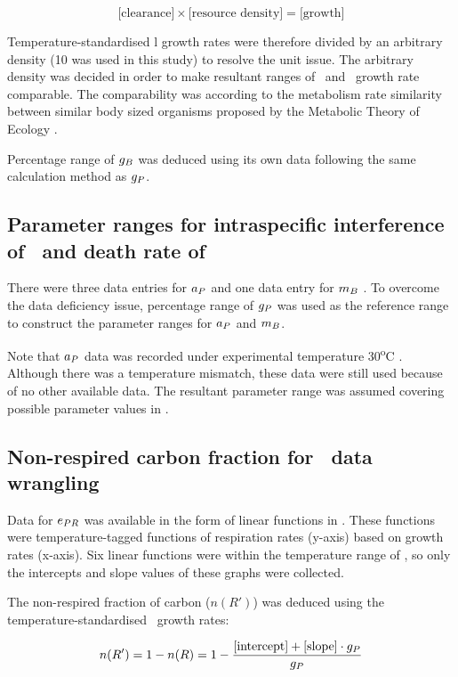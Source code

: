 \documentclass[../thesis.tex]{subfiles} %
\begin{document}
\begin{equation}
    \text{[clearance]} \times \text{[resource density]} = \text{[growth]}
    \label{eq:gB}
\end{equation}

Temperature-standardised \bac l growth rates were therefore divided by an arbitrary density (10 was used in this study) to resolve the unit issue.  The arbitrary density was decided in order to make resultant ranges of \phy\ and \bac\ growth rate comparable.  The comparability was according to the metabolism rate similarity between similar body sized organisms proposed by the Metabolic Theory of Ecology \autocite{brown2004toward}.

Percentage range of $g_B$ was deduced using its own data following the same calculation method as $g_P$.

\subsection{Parameter ranges for intraspecific interference of \phy\ and death rate of \bac}
There were three data entries for $a_P$ \autocite{de2007biofixation} and one data entry for $m_B$ \autocite{cochran1988estimation}.  To overcome the data deficiency issue, percentage range of $g_P$ was used as the reference range to construct the parameter ranges for $a_P$ and $m_B$.

Note that $a_P$ data was recorded under experimental temperature 30\textsuperscript{o}C \autocite{de2007biofixation}.  Although there was a temperature mismatch, these data were still used because of no other available data.  The resultant parameter range was assumed covering possible parameter values in \temp.

\subsection{Non-respired carbon fraction for \phy\ data wrangling}
Data for $e_{PR}$ was available in the form of linear functions in \autocite{j1989respiration}.  These functions were temperature-tagged functions of respiration rates (y-axis) based on growth rates (x-axis).  Six linear functions were within the temperature range of \temp, so only the intercepts and slope values of these graphs were collected.

The non-respired fraction of carbon ($n(R')$) was deduced using the temperature-standardised \phy\ growth rates:

\begin{equation}
    n(R') = 1-n(R) = 1-\dfrac{[\text{intercept}]+[\text{slope}]\cdot g_P}{g_P}
    \label{ePReqn}
\end{equation}
\end{document}
